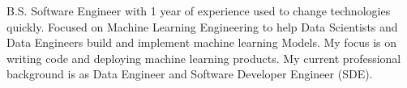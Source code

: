 

\begin{cvparagraph}

B.S. Software Engineer with 1 year of experience used to change technologies quickly. Focused on Machine Learning Engineering to help Data Scientists and Data Engineers build and implement machine learning Models. My focus is on writing code and deploying machine learning products. My current professional background is as Data Engineer and Software Developer Engineer (SDE).
\end{cvparagraph}
